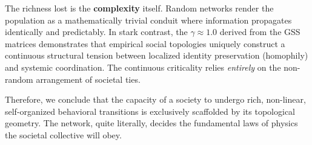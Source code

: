 \documentclass[12pt, a4paper]{article}
\begin{document}
The richness lost is the \textbf{complexity} itself. Random networks render the population as a mathematically trivial conduit where information propagates identically and predictably. In stark contrast, the $\gamma \approx 1.0$ derived from the GSS matrices demonstrates that empirical social topologies uniquely construct a continuous structural tension between localized identity preservation (homophily) and systemic coordination. The continuous criticality relies \textit{entirely} on the non-random arrangement of societal ties. 

Therefore, we conclude that the capacity of a society to undergo rich, non-linear, self-organized behavioral transitions is exclusively scaffolded by its topological geometry. The network, quite literally, decides the fundamental laws of physics the societal collective will obey.
\end{document}
